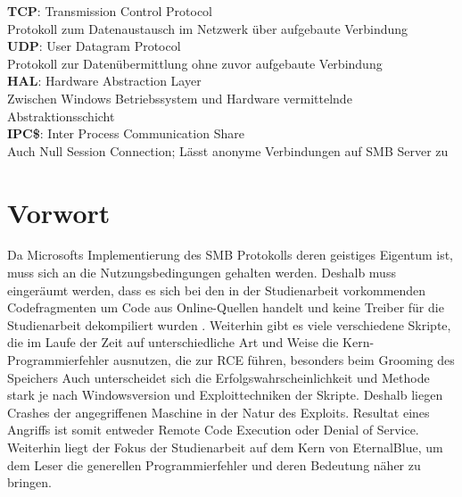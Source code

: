 \documentclass[DIV=12,headings=normal,pdftex,headinclude=false,footinclude=false,final]{scrreprt}
\begin{document}
\noindent
\textbf{TCP}: Transmission Control Protocol\\
Protokoll zum Datenaustausch im Netzwerk über aufgebaute Verbindung\\

\noindent
\textbf{UDP}: User Datagram Protocol\\
Protokoll zur Datenübermittlung ohne zuvor aufgebaute Verbindung\\

\noindent
\textbf{HAL}: Hardware Abstraction Layer\\
Zwischen Windows Betriebssystem und Hardware vermittelnde Abstraktionsschicht\\

\noindent
\textbf{IPC\$}: Inter Process Communication Share\\
Auch Null Session Connection; Lässt anonyme Verbindungen auf SMB Server zu\\

\newpage
{}


\chapter{Vorwort}
Da Microsofts Implementierung des SMB Protokolls deren geistiges Eigentum ist, muss sich an die Nutzungsbedingungen gehalten werden. Deshalb muss eingeräumt werden, dass es sich bei den in der Studienarbeit vorkommenden Codefragmenten um Code aus Online-Quellen handelt und keine Treiber für die Studienarbeit dekompiliert wurden \cite{MS:LicTerm}. Weiterhin gibt es viele verschiedene Skripte, die im Laufe der Zeit auf unterschiedliche Art und Weise die Kern-Programmierfehler ausnutzen, die zur RCE führen, besonders beim Grooming des Speichers Auch unterscheidet sich die Erfolgswahrscheinlichkeit und Methode stark je nach Windowsversion und Exploittechniken der Skripte. Deshalb liegen Crashes der angegriffenen Maschine in der Natur des Exploits. Resultat eines Angriffs ist somit entweder Remote Code Execution oder Denial of Service. Weiterhin liegt der Fokus der Studienarbeit auf dem Kern von EternalBlue, um dem Leser die generellen Programmierfehler und deren Bedeutung näher zu bringen. 
\end{document}
